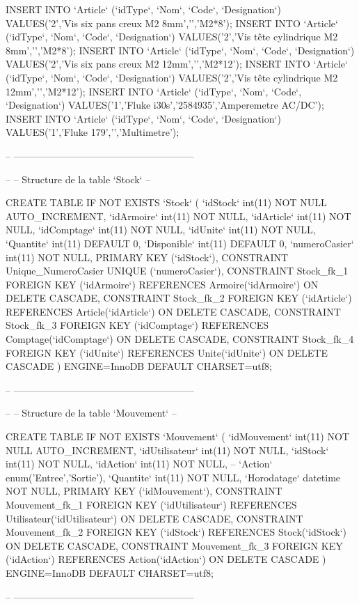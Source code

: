 \begin{DoxyCode}
INSERT INTO `Article` (`idType`, `Nom`, `Code`, `Designation`) VALUES('2','Vis six pans creux M2
       8mm','','M2*8');
INSERT INTO `Article` (`idType`, `Nom`, `Code`, `Designation`) VALUES('2','Vis tête cylindrique M2
       8mm','','M2*8');
INSERT INTO `Article` (`idType`, `Nom`, `Code`, `Designation`) VALUES('2','Vis six pans creux M2
       12mm','','M2*12');
INSERT INTO `Article` (`idType`, `Nom`, `Code`, `Designation`) VALUES('2','Vis tête cylindrique M2
       12mm','','M2*12');
INSERT INTO `Article` (`idType`, `Nom`, `Code`, `Designation`) VALUES('1','Fluke
       i30s','2584935','Amperemetre AC/DC');
INSERT INTO `Article` (`idType`, `Nom`, `Code`, `Designation`) VALUES('1','Fluke 179','','Multimetre');

-- --------------------------------------------------------

--
-- Structure de la table `Stock`
--

CREATE TABLE IF NOT EXISTS `Stock` (
  `idStock` int(11) NOT NULL AUTO\_INCREMENT,
  `idArmoire` int(11) NOT NULL,
  `idArticle` int(11) NOT NULL,
  `idComptage` int(11) NOT NULL,
  `idUnite` int(11) NOT NULL,
  `Quantite` int(11) DEFAULT 0,
  `Disponible` int(11) DEFAULT 0,
  `numeroCasier` int(11) NOT NULL,
  PRIMARY KEY (`idStock`),
  CONSTRAINT Unique\_NumeroCasier UNIQUE (`numeroCasier`),
  CONSTRAINT Stock\_fk\_1 FOREIGN KEY (`idArmoire`) REFERENCES Armoire(`idArmoire`) ON DELETE CASCADE,
  CONSTRAINT Stock\_fk\_2 FOREIGN KEY (`idArticle`) REFERENCES Article(`idArticle`) ON DELETE CASCADE,
  CONSTRAINT Stock\_fk\_3 FOREIGN KEY (`idComptage`) REFERENCES Comptage(`idComptage`) ON DELETE CASCADE,
  CONSTRAINT Stock\_fk\_4 FOREIGN KEY (`idUnite`) REFERENCES Unite(`idUnite`) ON DELETE CASCADE
) ENGINE=InnoDB DEFAULT CHARSET=utf8;

-- --------------------------------------------------------

--
-- Structure de la table `Mouvement`
--

CREATE TABLE IF NOT EXISTS `Mouvement` (
  `idMouvement` int(11) NOT NULL AUTO\_INCREMENT, 
  `idUtilisateur` int(11) NOT NULL,
  `idStock` int(11) NOT NULL,
  `idAction` int(11) NOT NULL,
  --   `Action` enum('Entree','Sortie'),
  `Quantite` int(11) NOT NULL,
  `Horodatage` datetime NOT NULL,
  PRIMARY KEY (`idMouvement`),
  CONSTRAINT Mouvement\_fk\_1 FOREIGN KEY (`idUtilisateur`) REFERENCES Utilisateur(`idUtilisateur`) ON DELETE
       CASCADE,
  CONSTRAINT Mouvement\_fk\_2 FOREIGN KEY (`idStock`) REFERENCES Stock(`idStock`) ON DELETE CASCADE,
  CONSTRAINT Mouvement\_fk\_3 FOREIGN KEY (`idAction`) REFERENCES Action(`idAction`) ON DELETE CASCADE
) ENGINE=InnoDB DEFAULT CHARSET=utf8;

-- --------------------------------------------------------
\end{DoxyCode}
 